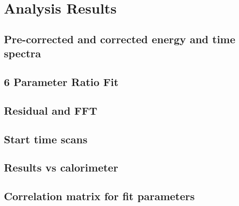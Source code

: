 \chapter{Analysis Results}


\section{Pre-corrected and corrected energy and time spectra}

\section{6 Parameter Ratio Fit}


\section{Residual and FFT}




\section{Start time scans}


\section{Results vs calorimeter}



\section{Correlation matrix for fit parameters}



